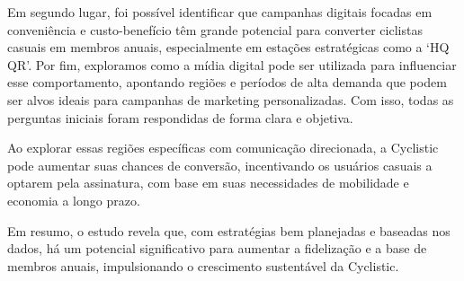\documentclass[
]{article}
\begin{document}
Em segundo lugar, foi possível identificar que campanhas digitais
focadas em conveniência e custo-benefício têm grande potencial para
converter ciclistas casuais em membros anuais, especialmente em estações
estratégicas como a `HQ QR'. Por fim, exploramos como a mídia digital
pode ser utilizada para influenciar esse comportamento, apontando
regiões e períodos de alta demanda que podem ser alvos ideais para
campanhas de marketing personalizadas. Com isso, todas as perguntas
iniciais foram respondidas de forma clara e objetiva.

Ao explorar essas regiões específicas com comunicação direcionada, a
Cyclistic pode aumentar suas chances de conversão, incentivando os
usuários casuais a optarem pela assinatura, com base em suas
necessidades de mobilidade e economia a longo prazo.

Em resumo, o estudo revela que, com estratégias bem planejadas e
baseadas nos dados, há um potencial significativo para aumentar a
fidelização e a base de membros anuais, impulsionando o crescimento
sustentável da Cyclistic.
\end{document}
